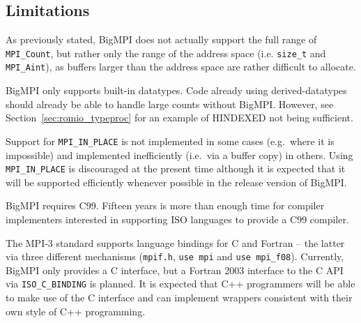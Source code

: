 \subsection{Limitations}

As previously stated, BigMPI does not actually support the full
range of \texttt{MPI\_Count}, but rather only the range of the
address space (i.e. \texttt{size\_t} and \texttt{MPI\_Aint}), as buffers
larger than the address space are rather difficult to allocate.

BigMPI only supports built-in datatypes.  
Code already using derived-datatypes should already be able 
to handle large counts without BigMPI\@.
However, see Section~\ref{sec:romio_typeproc} 
for an example of HINDEXED not being sufficient.

Support for \texttt{MPI\_IN\_PLACE} is not 
implemented in some cases (e.g.\ where it is impossible) and 
implemented inefficiently (i.e.\ via a buffer copy) in others.
Using \texttt{MPI\_IN\_PLACE} is discouraged at the present time
although it is expected that it will be supported efficiently whenever
possible in the release version of BigMPI.

BigMPI requires C99.  Fifteen years is more than enough time for compiler 
implementers interested in supporting ISO languages to provide a C99
compiler.

The MPI-3 standard supports language bindings for C and Fortran --
the latter via three different mechanisms
(\texttt{mpif.h}, \texttt{use mpi} and \texttt{use mpi\_f08}).
Currently, BigMPI only provides a C interface, but a Fortran 2003
interface to the C API via \texttt{ISO\_C\_BINDING} is planned.
It is expected that C++ programmers will be able to make use of the
C interface and can implement wrappers consistent with their own
style of C++ programming.
